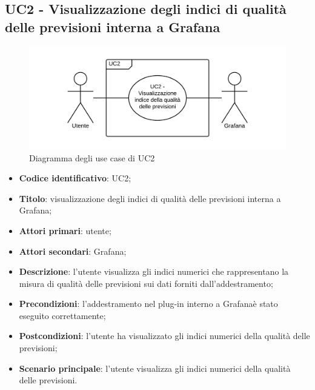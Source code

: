 \subsection{UC2 - Visualizzazione degli indici di qualità delle previsioni interna a Grafana}
\begin{figure}[H]
\includegraphics{img/UC2_-_Visualizzazione_indice_della_qualit_delle_previsioni.png}
\caption{Diagramma degli use case di UC2}
\end{figure}
\begin{itemize}
	\item \textbf{Codice identificativo}: UC2;
	\item \textbf{Titolo}: visualizzazione degli indici di qualità delle previsioni interna a Grafana;
	\item \textbf{Attori primari}: utente;
	\item \textbf{Attori secondari}: Grafana\glo;
	\item \textbf{Descrizione}: l'utente visualizza gli indici numerici che rappresentano la misura di qualità delle previsioni sui dati forniti dall'addestramento;
	\item \textbf{Precondizioni}: l'addestramento nel plug-in interno a Grafana\glosp è stato eseguito correttamente;
	\item \textbf{Postcondizioni}: l'utente ha visualizzato gli indici numerici della qualità delle previsioni;
	\item \textbf{Scenario principale}: l'utente visualizza gli indici numerici della qualità delle previsioni.
\end{itemize}
